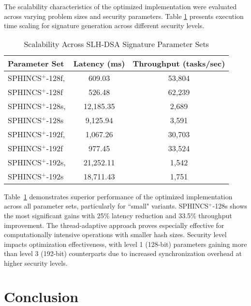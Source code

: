\documentclass[journal]{IEEEtran}
\begin{document}
The scalability characteristics of the optimized implementation were evaluated across varying problem sizes and security parameters. Table \ref{tab:scalability} presents execution time scaling for signature generation across different security levels.

\begin{table}[h]
  \color{blue}
  \centering
  \caption{Scalability Across SLH-DSA Signature Parameter Sets}
  \label{tab:scalability}
  \begin{tabular}{@{}lcc@{}}
    \toprule
    \textbf{Parameter Set} & \textbf{Latency (ms)} & \textbf{Throughput (tasks/sec)} \\
    \midrule
    SPHINCS$^+$-128f, \cite{Wang2025} & 609.03 & 53,804 \\
    SPHINCS$^+$-128f & 526.48 & 62,239 \\
    \midrule
    SPHINCS$^+$-128s, \cite{Wang2025} & 12,185.35 & 2,689 \\
    SPHINCS$^+$-128s & 9,125.94 & 3,591 \\
    \midrule
    SPHINCS$^+$-192f, \cite{Wang2025} & 1,067.26 & 30,703 \\
    SPHINCS$^+$-192f & 977.45 & 33,524 \\
    \midrule
    SPHINCS$^+$-192s, \cite{Wang2025} & 21,252.11 & 1,542 \\
    SPHINCS$^+$-192s & 18,711.43 & 1,751 \\
    \bottomrule
  \end{tabular}
\end{table}


Table~\ref{tab:scalability} demonstrates superior performance of the optimized implementation across all parameter sets, particularly for ``small" variants. SPHINCS$^+$-128s shows the most significant gains with 25\% latency reduction and 33.5\% throughput improvement. The thread-adaptive approach proves especially effective for computationally intensive operations with smaller hash sizes. Security level impacts optimization effectiveness, with level 1 (128-bit) parameters gaining more than level 3 (192-bit) counterparts due to increased synchronization overhead at higher security levels.

\color{black}

\section{Conclusion}\label{sec:conclusion}
\end{document}
